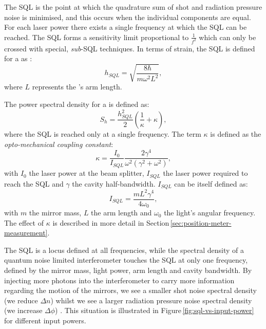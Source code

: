 The \gls{SQL} is the point at which the quadrature sum of shot and radiation pressure noise is minimised, and this occurs when the individual components are equal. For each laser power there exists a single frequency at which the \gls{SQL} can be reached. The \gls{SQL} forms a sensitivity limit proportional to $\frac{1}{f^2}$ which can only be crossed with special, \emph{sub}-\gls{SQL} techniques. In terms of strain, the \gls{SQL} is defined for a \MI{} as \cite{Braginsky1996}:
\begin{equation}
  \label{eq:strainsql}
  h_{SQL} = \sqrt{\frac{8 \hbar}{m \omega^2 L^2}},
\end{equation}
where $L$ represents the \MI{}'s arm length.

The power spectral density for a \MI{} is defined as:
\begin{equation}
  \label{eq:classicalifospectrum}
  S_h = \frac{h^{2}_{SQL}}{2} \left( \frac{1}{\kappa} + \kappa \right),
\end{equation}
where the \gls{SQL} is reached only at a single frequency. The term $\kappa$ is defined as the \emph{opto-mechanical coupling constant}:
\begin{equation}
 \kappa = \frac{I_0}{I_{SQL}} \frac{2 \gamma^4}{\omega^2 \left( \gamma^2 +
\omega^2 \right)},
 \label{eq:optomechanicalcoupling}
\end{equation}
with $I_0$ the laser power at the beam splitter, $I_{SQL}$ the laser power required to reach the \gls{SQL} and $\gamma$ the cavity half-bandwidth. $I_{SQL}$ can be itself defined as:
\begin{equation}
 I_{SQL} = \frac{m L^2 \gamma^4}{4 \omega_0},
\end{equation}
with $m$ the mirror mass, $L$ the arm length and $\omega_0$ the light's angular frequency. The effect of $\kappa$ is described in more detail in Section\,\ref{sec:position-meter-measurement}.

The \gls{SQL} is a locus defined at all frequencies, while the spectral density of a quantum noise limited interferometer touches the \gls{SQL} at only one frequency, defined by the mirror mass, light power, arm length and cavity bandwidth. By injecting more photons into the interferometer to carry more information regarding the motion of the mirrors, we see a smaller shot noise spectral density (we reduce $\Delta n$) whilst we see a larger radiation pressure noise spectral density (we increase $\Delta \phi$) \cite{Caves1981}. This situation is illustrated in Figure\,\ref{fig:sql-vs-input-power} for different input powers.

